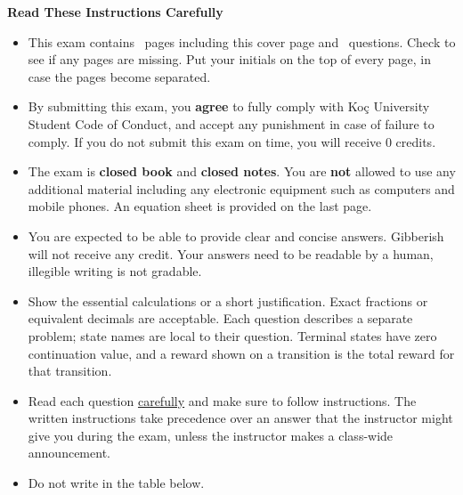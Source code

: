 \documentclass[11pt]{exam}
\newcommand{\class}{COMP 438/538}
\newcommand{\examnum}{MT1}
\newcommand{\examdate}{05/11/2026}
\begin{document}
  \vspace{0.4cm}
  \hrulefill
\begin{center}
{\large \bfseries Read These Instructions Carefully}
\end{center}
\begin{itemize}
  \item This exam contains \numpages\ pages including this cover page and \numquestions\ questions. Check to see if any
  pages are missing. Put your initials on the top of every page, in case the pages become separated.
  \item  By submitting this exam, you \textbf{agree} to fully comply with Ko\c{c} University Student Code of Conduct,
  and accept any punishment in case of failure to comply. If you do not submit this exam on time, you will receive 0 credits.
  \item The exam is \textbf{closed book} and \textbf{closed notes}. You are \textbf{not} allowed to use any additional
  material including any electronic equipment such as computers and  mobile phones. An equation sheet is provided on
  the last page.
  \item You are expected to be able to provide clear and concise answers. Gibberish will not receive any credit. Your answers need to be readable by a human,
  illegible writing is not gradable.
  \item Show the essential calculations or a short justification. Exact fractions or equivalent decimals are acceptable.
  Each question describes a separate problem; state names are local to their question. Terminal states have zero
  continuation value, and a reward shown on a transition is the total reward for that transition.
  \item Read each question \uline{carefully} and make sure to follow instructions. The written instructions take
  precedence over an answer that the instructor might give you during the exam, unless the instructor makes a class-wide announcement.
  \item Do not write in the table below.
\end{itemize}

\hrulefill
  \begin{center}
    \vspace{0.2cm}
    \addpoints
    \gradetable[h]
  \end{center}

\newpage %
\runningheader{\class}{\examnum\ - Page \thepage\ of \numpages}{\examdate}
\runningheadrule
\end{document}
